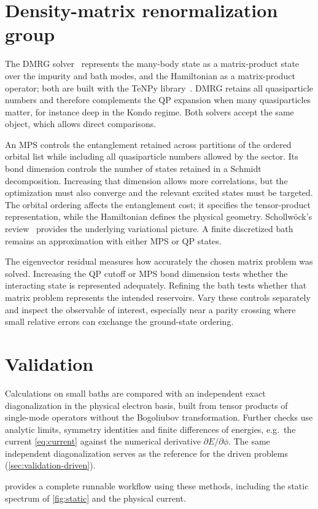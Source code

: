 \section{Density-matrix renormalization group}\label{sec:dmrg}

The DMRG solver~\cite{white1992density,schollwock2011density} represents the many-body
state as a matrix-product state over the impurity and bath modes, and the Hamiltonian as a
matrix-product operator; both are built with the TeNPy library~\cite{hauschild2018efficient}.
DMRG retains all quasiparticle numbers and therefore complements the QP expansion when many
quasiparticles matter, for instance deep in the Kondo regime. Both solvers accept the same
 object, which allows direct comparisons.

An MPS controls the entanglement retained across partitions of the ordered orbital
list while including all quasiparticle numbers allowed by the sector. Its bond dimension controls
the number of states retained in a Schmidt decomposition. Increasing that dimension
allows more correlations, but the optimization must also converge and the relevant
excited states must be targeted. The orbital ordering affects the entanglement cost;
it specifies the tensor-product representation, while the Hamiltonian defines the physical geometry.
Schollw\"ock's review~\cite{schollwock2011density} provides the underlying
variational picture. A finite discretized bath remains an approximation with
either MPS or QP states.

\begin{physics}
The eigenvector residual measures how accurately the chosen matrix problem was solved.
Increasing the QP cutoff or MPS bond dimension tests whether the interacting state
is represented adequately. Refining the bath tests whether that matrix problem
represents the intended reservoirs. Vary these controls separately and inspect
the observable of interest, especially near a parity crossing where small
relative errors can exchange the ground-state ordering.
\end{physics}

\section{Validation}

Calculations on small baths are compared with an independent exact diagonalization in the
physical electron basis, built from tensor products of single-mode operators without the
Bogoliubov transformation. Further checks use analytic limits, symmetry identities and
finite differences of energies, e.g.\ the current \eqref{eq:current} against the numerical
derivative $\partial E/\partial\phi$. The same independent diagonalization serves as the
reference for the driven problems (\cref{sec:validation-driven}).

 provides a complete runnable workflow using these methods,
including the static spectrum of \cref{fig:static} and the physical current.

